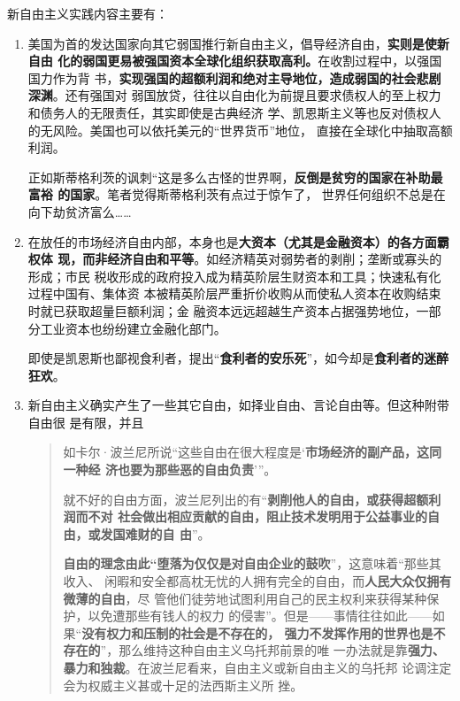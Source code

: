 新自由主义实践内容主要有：
\begin{enumerate}
\item 美国为首的发达国家向其它弱国推行新自由主义，倡导经济自由，\textbf{实则是使新自由
    化的弱国更易被强国资本全球化组织获取高利。}在收割过程中，以强国国力作为背
  书，\textbf{实现强国的超额利润和绝对主导地位，造成弱国的社会悲剧深渊}。还有强国对
  弱国放贷，往往以自由化为前提且要求债权人的至上权力和债务人的无限责任，其实即使是古典经济
  学、凯恩斯主义等也反对债权人的无风险。美国也可以依托美元的“世界货币”地位，
  直接在全球化中抽取高额利润。

  正如斯蒂格利茨的讽刺“这是多么古怪的世界啊，\textbf{反倒是贫穷的国家在补助最富裕
    的国家}\cite[75]{davidneoliber}。笔者觉得斯蒂格利茨有点过于惊乍了，
  世界任何组织不总是在向下劫贫济富么……


\item 在放任的市场经济自由内部，本身也是\textbf{大资本（尤其是金融资本）的各方面霸权体
    现，而非经济自由和平等}。如经济精英对弱势者的剥削；垄断或寡头的形成；市民
  税收形成的政府投入成为精英阶层生财资本和工具；快速私有化过程中国有、集体资
  本被精英阶层严重折价收购从而使私人资本在收购结束时就已获取超量巨额利润；金
  融资本远远超越生产资本占据强势地位，一部分工业资本也纷纷建立金融化部门。

  即使是凯恩斯也鄙视食利者，提出“\textbf{食利者的安乐死}”，如今却是\textbf{食利者的迷醉
    狂欢}。

\item 新自由主义确实产生了一些其它自由，如择业自由、言论自由等。但这种附带自由很
  是有限，并且
  \begin{quotation}
    如卡尔·波兰尼所说“这些自由在很大程度是‘\textbf{市场经济的副产品，这同一种经
      济也要为那些恶的自由负责}’”。

    就不好的自由方面，波兰尼列出的有“\textbf{剥削他人的自由，或获得超额利润而不对
      社会做出相应贡献的自由，阻止技术发明用于公益事业的自由，或发国难财的自
      由}”。

    \textbf{自由的理念由此“堕落为仅仅是对自由企业的鼓吹}”，这意味着“那些其收入、
    闲暇和安全都高枕无忧的人拥有完全的自由，而\textbf{人民大众仅拥有微薄的自由}，尽
    管他们徒劳地试图利用自己的民主权利来获得某种保护，以免遭那些有钱人的权力
    的侵害”。但是——事情往往如此——如果“\textbf{没有权力和压制的社会是不存在的，
      强力不发挥作用的世界也是不存在的}”，那么维持这种自由主义乌托邦前景的唯
    一办法就是靠\textbf{强力、暴力和独裁}。在波兰尼看来，自由主义或新自由主义的乌托邦
    论调注定会为权威主义甚或十足的法西斯主义所
    挫。 \cite[38-39]{davidneoliber}
  \end{quotation}


\end{enumerate}
